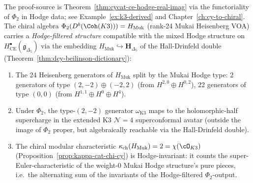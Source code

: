 \begin{proposition}
\label{prop:dcy-phi-k3-hodge-filtered}
The proof-source is Theorem~\textup{\ref{thm:cycat-ce-hodge-real-imag}}
via the functoriality of $\Phi_2$ in Hodge data; see
Example~\textup{\ref{ex:k3-derived}} and
Chapter~\textup{\ref{ch:cy-to-chiral}}.
The chiral algebra $\Phi_2(D^b(\Coh(K3))) = H_{\mathrm{Muk}}$
(rank-24 Mukai Heisenberg VOA) carries a \emph{Hodge-filtered
structure} compatible with the mixed Hodge structure on
$H^\bullet_{\mathrm{CE}}(\mathfrak{g}_{\Delta_5})$ via the
embedding $H_{\mathrm{Muk}} \hookrightarrow \mathbf{H}_{\Delta_5}$
of the Hall-Drinfeld double (Theorem~\textup{\ref{thm:dcy-beilinson-dictionary}}):
\begin{enumerate}[label=(\alph*)]
 \item The 24 Heisenberg generators of $H_{\mathrm{Muk}}$ split by
 the Mukai Hodge type: 2 generators of type $(2,-2) \oplus (-2,2)$
 (from $H^{2,0} \oplus H^{0,2}$), 22 generators of type $(0,0)$
 (from $H^{1,1} \oplus H^0 \oplus H^4$).
 \item Under $\Phi_2$, the type-$(2,-2)$ generator $\omega_{\mathrm{K3}}$
 maps to the holomorphic-half supercharge in the extended K3
 $\mathcal{N}=4$ superconformal avatar (outside the image of
 $\Phi_2$ proper, but algebraically reachable via the Hall-Drinfeld
 double).
 \item The chiral modular characteristic $\kappa_{\mathrm{ch}}(H_{\mathrm{Muk}})
 = 2 = \chi(\cO_{K3})$ (Proposition~\textup{\ref{prop:kappa-cat-chi-cy}})
 is Hodge-invariant: it counts the super-Euler-characteristic of the
 weight-$0$ Mukai Hodge structure's pure pieces, i.e.\ the alternating
 sum of the invariants of the Hodge-filtered $\Phi_2$-output.
\end{enumerate}
\end{proposition}


